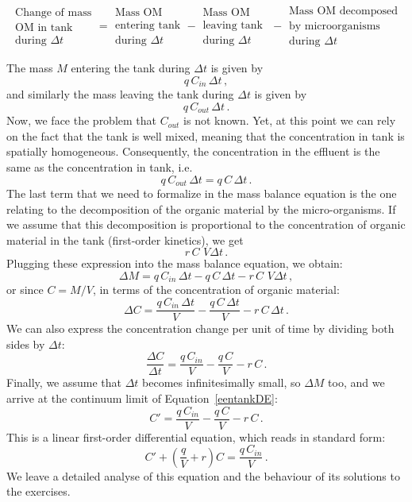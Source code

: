 \begin{example}
\[
	\left.\begin{array}{c}
    \mbox{Change of mass}\\
	\mbox{OM in tank }\\
	\mbox{during $\Delta t$}
	\end{array}
	\right. =
	\left.\begin{array}{c}
	\mbox{Mass OM }\\
    \mbox{entering tank}\\
	\mbox{during $\Delta t$}
	\end{array}
	\right. -
	\left.\begin{array}{c}
	\mbox{Mass OM }\\
    \mbox{leaving tank }\\
	\mbox{during $\Delta t$}
	\end{array}
	\right.
	-
	\left.\begin{array}{c}
	\mbox{Mass OM decomposed}\\
    \mbox{by microorganisms}\\
	\mbox{during $\Delta t$}
	\end{array}
	\right.
\]

The mass $M$ entering the tank during $\Delta t$ is given by
$$
q\,C_{in}\,\Delta t\,,
$$
and similarly the mass leaving the tank during $\Delta t$ is given by
$$
q\,C_{out}\,\Delta t\,. 
$$
Now, we face the problem that $C_{out}$ is not known. Yet, at this point we can rely on the fact that the tank is well mixed, meaning that the concentration in tank is spatially homogeneous. Consequently, the concentration in the effluent is the same as the concentration in tank, i.e.
$$
q\,C_{out}\,\Delta t=q\,C\,\Delta t\,. 
$$
The last term that we need to formalize in the mass balance equation is the one relating to the decomposition of the organic material by the micro-organisms. If we assume that this decomposition is proportional to the concentration of organic material in the tank (first-order kinetics), we get 
$$
r\,C\,\,V\Delta t\,.
$$
Plugging these expression into the mass balance equation, we obtain:
$$
\Delta M=q\,C_{in}\,\Delta t-q\,C\,\Delta t-r\,C\,\,V\Delta t\,,
$$
or since $C=M/V$, in terms of the concentration of organic material:
$$
\Delta C=\dfrac{q\,C_{in}\,\Delta t}{V}-\dfrac{q\,C\,\Delta t}{V}-r\,C\,\Delta t\,.
$$
We can also express the concentration change per unit of time by dividing both sides by $\Delta t$:
\begin{equation}
\label{eentankDE}
\dfrac{\Delta C}{\Delta t}=\dfrac{q\,C_{in}}{V}-\dfrac{q\,C}{V}-r\,C\,.
\end{equation}
Finally, we assume that $\Delta t$ becomes infinitesimally small, so $\Delta M$ too, and we arrive at the continuum limit of Equation~\eqref{eentankDE}:
$$
C'=\dfrac{q\,C_{in}}{V}-\dfrac{q\,C}{V}-r\,C\,.
$$
This is a linear first-order differential equation, which reads in standard form:
\begin{equation}
\label{eentank}
C'+\left(\dfrac{q}{V}+r\right)C=\dfrac{q\,C_{in}}{V}\,.
\end{equation}
We leave a detailed analyse of this equation and the behaviour of its solutions to the exercises. 
\end{example}


